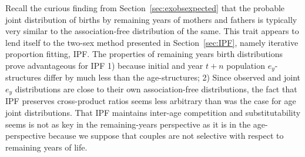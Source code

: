 \label{sec:ipfex}
Recall the curious finding from Section~\ref{sec:exobsexpected} that the
probable joint distribution of births by remaining years of mothers and fathers is typically
very similar to the association-free distribution of the same. This trait
appears to lend itself to the two-sex method presented in Section~\ref{sec:IPF},
namely iterative proportion fitting, IPF. The properties of remaining
years birth distributions prove advantageous for IPF 1) because initial and year
$t+n$ population $e_y$-structures differ by much less than the age-structures;
2) Since observed and joint $e_y$ distributions are close to their own
association-free distributions, the fact that IPF preserves cross-product ratios
seems less arbitrary than was the case for age joint distributions. That IPF
maintains inter-age competition and substitutability seems is not as key in the
remaining-years perspective as it is in the age-perspective because we suppose
that couples are not selective with respect to remaining years of life.









